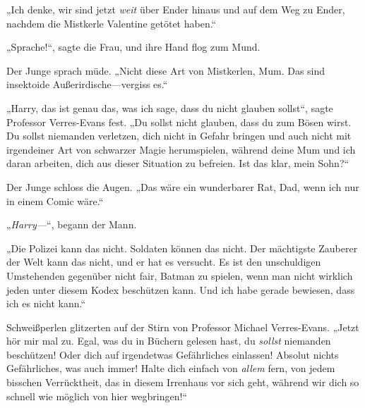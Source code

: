 „Ich denke, wir sind jetzt \emph{weit} über Ender hinaus und auf dem Weg zu Ender, nachdem die Mistkerle Valentine getötet haben.“

„Sprache!“, sagte die Frau, und ihre Hand flog zum Mund.

Der Junge sprach müde. „Nicht diese Art von Mistkerlen, Mum. Das sind insektoide Außerirdische—vergiss es.“

„Harry, das ist genau das, was ich sage, dass du nicht glauben sollst“, sagte Professor Verres-Evans fest. „Du sollst nicht glauben, dass du zum Bösen wirst. Du sollst niemanden verletzen, dich nicht in Gefahr bringen und auch nicht mit irgendeiner Art von schwarzer Magie herumspielen, während deine Mum und ich daran arbeiten, dich aus dieser Situation zu befreien. Ist das klar, mein Sohn?“

Der Junge schloss die Augen. „Das wäre ein wunderbarer Rat, Dad, wenn ich nur in einem Comic wäre.“

„\emph{Harry—}“, begann der Mann.

„Die Polizei kann das nicht. Soldaten können das nicht. Der mächtigste Zauberer der Welt kann das nicht, und er hat es versucht. Es ist den unschuldigen Umstehenden gegenüber nicht fair, Batman zu spielen, wenn man nicht wirklich jeden unter diesem Kodex beschützen kann. Und ich habe gerade bewiesen, dass ich es nicht kann.“

Schweißperlen glitzerten auf der Stirn von Professor Michael Verres-Evans. „Jetzt hör mir mal zu. Egal, was du in Büchern gelesen hast, du \emph{sollst} niemanden beschützen! Oder dich auf irgendetwas Gefährliches einlassen! Absolut nichts Gefährliches, was auch immer! Halte dich einfach von \emph{allem} fern, von jedem bisschen Verrücktheit, das in diesem Irrenhaus vor sich geht, während wir dich so schnell wie möglich von hier wegbringen!“

